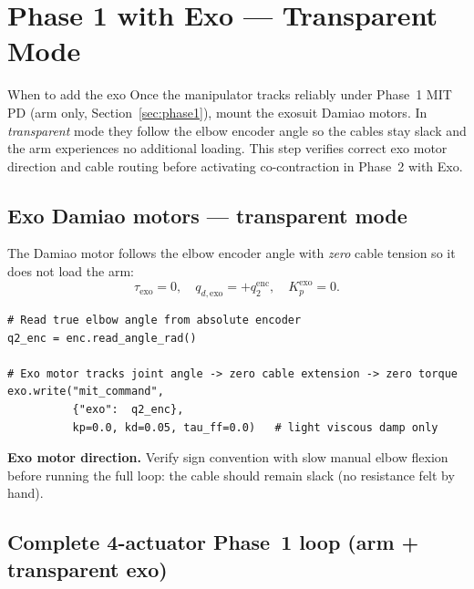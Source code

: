 \documentclass[11pt,a4paper]{article}
\begin{document}
\section{Phase 1 with Exo --- Transparent Mode}
\label{sec:phase1_exo}

\begin{phase1box}{When to add the exo}
Once the manipulator tracks reliably under Phase~1 MIT PD (arm only,
Section~\ref{sec:phase1}), mount the exosuit Damiao motors.  In
\emph{transparent} mode they follow the elbow encoder angle so the cables
stay slack and the arm experiences no additional loading.  This step
verifies correct exo motor direction and cable routing before activating
co-contraction in Phase~2 with Exo.
\end{phase1box}

\subsection{Exo Damiao motors --- transparent mode}

The Damiao motor follows the elbow encoder angle with \emph{zero} cable
tension so it does not load the arm:
\begin{equation}
  \tau_{\mathrm{exo}} = 0,\quad
  q_{d,\mathrm{exo}} = +q_2^{\mathrm{enc}},\quad
  K_p^{\mathrm{exo}} = 0.
  \label{eq:exo_transparent}
\end{equation}

\begin{lstlisting}[caption={Exo transparent mode: Damiao motor follows AS5048A encoder.}]
# Read true elbow angle from absolute encoder
q2_enc = enc.read_angle_rad()

# Exo motor tracks joint angle -> zero cable extension -> zero torque
exo.write("mit_command",
          {"exo":  q2_enc},
          kp=0.0, kd=0.05, tau_ff=0.0)   # light viscous damp only
\end{lstlisting}

\begin{warnbox}
\textbf{Exo motor direction.}
Verify sign convention with slow manual elbow flexion before running the
full loop: the cable should remain slack (no resistance felt by hand).
\end{warnbox}

\subsection{Complete 4-actuator Phase~1 loop (arm + transparent exo)}
\end{document}
